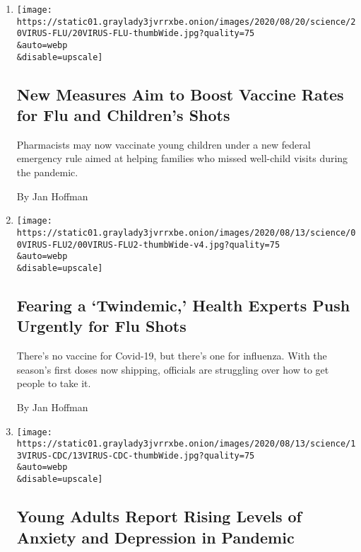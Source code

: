 \begin{enumerate}
\def\labelenumi{\arabic{enumi}.}
\item
  \href{/2020/08/20/health/coronavirus-flu-vaccine.html}{}

  \texttt{[image: https://static01.graylady3jvrrxbe.onion/images/2020/08/20/science/20VIRUS-FLU/20VIRUS-FLU-thumbWide.jpg?quality=75\\\&auto=webp\\\&disable=upscale]}

  \hypertarget{new-measures-aim-to-boost-vaccine-rates-for-flu-and-childrens-shots}{%
  \subsection{New Measures Aim to Boost Vaccine Rates for Flu and
  Children's
  Shots}\label{new-measures-aim-to-boost-vaccine-rates-for-flu-and-childrens-shots}}

  Pharmacists may now vaccinate young children under a new federal
  emergency rule aimed at helping families who missed well-child visits
  during the pandemic.

  By Jan Hoffman
\item
  \href{/2020/08/16/health/coronavirus-flu-vaccine-twindemic.html}{}

  \texttt{[image: https://static01.graylady3jvrrxbe.onion/images/2020/08/13/science/00VIRUS-FLU2/00VIRUS-FLU2-thumbWide-v4.jpg?quality=75\\\&auto=webp\\\&disable=upscale]}

  \hypertarget{fearing-a-twindemic-health-experts-push-urgently-for-flu-shots}{%
  \subsection{Fearing a `Twindemic,' Health Experts Push Urgently for
  Flu
  Shots}\label{fearing-a-twindemic-health-experts-push-urgently-for-flu-shots}}

  There's no vaccine for Covid-19, but there's one for influenza. With
  the season's first doses now shipping, officials are struggling over
  how to get people to take it.

  By Jan Hoffman
\item
  \href{/2020/08/13/health/Covid-mental-health-anxiety.html}{}

  \texttt{[image: https://static01.graylady3jvrrxbe.onion/images/2020/08/13/science/13VIRUS-CDC/13VIRUS-CDC-thumbWide.jpg?quality=75\\\&auto=webp\\\&disable=upscale]}

  \hypertarget{young-adults-report-rising-levels-of-anxiety-and-depression-in-pandemic}{%
  \subsection{Young Adults Report Rising Levels of Anxiety and
  Depression in
  Pandemic}\label{young-adults-report-rising-levels-of-anxiety-and-depression-in-pandemic}}


\end{enumerate}
